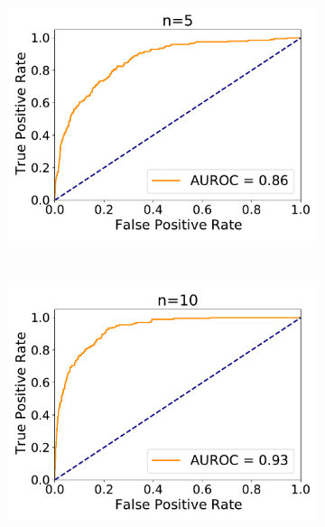 \begin{figure}[htb]
\begin{subfigure}{.33\textwidth}
		\includegraphics[width=1\linewidth]{figures/roc_particleFilter/AUROC_2000samples_class0_llh_n5}
		\caption{}
		\label{fig:roc_part_n5}
	\end{subfigure}\\
	\begin{subfigure}{.33\textwidth}
		\centering
		\includegraphics[width=1\linewidth]{figures/roc_particleFilter/AUROC_2000samples_class0_llh_n10}
		\caption{}
		\label{fig:roc_part_n10}
	\end{subfigure}%
	\begin{subfigure}{.33\textwidth}
		\centering

\end{subfigure}
\end{figure}
